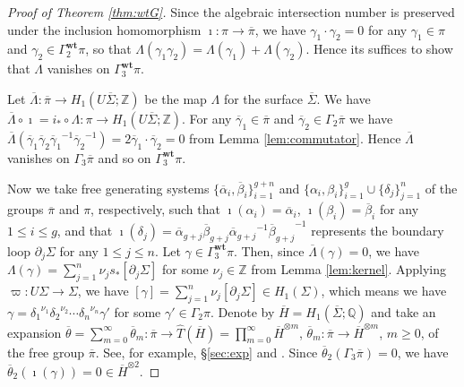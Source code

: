 \documentclass[a4paper,12pt, twoside]{amsart}
\theoremstyle{definition}
\theoremstyle{remark}
\numberwithin{equation}{section}
\newcommand\bQ{{\mathbb{Q}}}
\newcommand\bZ{{\mathbb{Z}}}
\newcommand\Gwt{\Gamma^{\mathbf{wt}}}
\newcommand\inv{^{-1}}
\newcommand\La{\Lambda}
\newcommand\pa{\partial}
\begin{document}
\begin{proof}[Proof of Theorem \ref{thm:wtG}]  Since the algebraic intersection number is preserved under the inclusion homomorphism $\imath: \pi \to \overline{\pi}$, we have $\gamma_1\cdot \gamma_2 = 0$ for any $\gamma_1\in\pi$ and $\gamma_2 \in \Gwt_2\pi$, 
so that $\La(\gamma_1\gamma_2) = \La(\gamma_1) + \La(\gamma_2)$. 
Hence its suffices to show that $\La$ vanishes on $\Gwt_3\pi$. \par
Let $\overline{\La}: \overline{\pi} \to H_1(U\overline{\Sigma}; \bZ)$ be the map $\La$ for the surface $\overline{\Sigma}$. 
We have $\overline{\La}\circ\imath = i_*\circ \La: \pi \to H_1(U\overline{\Sigma}; \bZ)$. 
For any $\overline{\gamma}_1 \in \overline{\pi}$ and $\overline{\gamma}_2 \in \Gamma_2\overline{\pi}$ we have $\overline{\La}(\overline{\gamma}_1\overline{\gamma}_2{\overline{\gamma}_1}\inv{\overline{\gamma}_2}\inv) = 2\overline{\gamma}_1\cdot \overline{\gamma}_2 = 0$ from Lemma \ref{lem:commutator}. Hence $\overline{\La}$ vanishes on $\Gamma_3\overline{\pi}$ and so on $\Gwt_3\pi$. \par
Now we take free generating systems $\{\overline{\alpha}_i, \overline{\beta}_i\}^{g+n}_{i=1}$ and $\{\alpha_i, \beta_i\}^g_{i=1}\cup \{\delta_j\}^n_{j=1}$ of the groups $\overline{\pi}$ and $\pi$, respectively, such that $\imath(\alpha_i) = \overline{\alpha}_i$, $\imath(\beta_i) = \overline{\beta}_i$ for any $1 \leq i \leq g$, and that $\imath(\delta_j) = \overline{\alpha}_{g+j}\overline{\beta}_{g+j}{\overline{\alpha}_{g+j}}\inv{\overline{\beta}_{g+j}}\inv$ represents the boundary loop $\pa_j\Sigma$ for any $1 \leq j \leq n$.  
Let $\gamma \in \Gwt_3\pi$. Then, since $\overline{\La}(\gamma) = 0$, 
we have $\La(\gamma) = \sum^n_{j=1}\nu_js_*[\pa_j\Sigma]$ for some $\nu_j \in \bZ$
from Lemma \ref{lem:kernel}. Applying $\varpi: U\Sigma \to \Sigma$, we have 
$[\gamma] = \sum^n_{j=1}\nu_j[\pa_j\Sigma] \in H_1(\Sigma)$, which means we have 
$\gamma = {\delta_1}^{\nu_1}{\delta_2}^{\nu_2}\cdots {\delta_n}^{\nu_n}\gamma'$ for some $\gamma' \in \Gamma_2\pi$. 
Denote by $\overline{H} = H_1(\overline{\Sigma}; \bQ)$ and take an expansion $\overline{\theta} = \sum^\infty_{m=0}\overline{\theta}_m: \overline{\pi} \to \widehat{T}(\overline{H}) = \prod^\infty_{m=0}\overline{H}^{\otimes m}$, 
$\overline{\theta}_m: \overline{\pi} \to \overline{H}^{\otimes m}$, $m \geq 0$, of the free group $\overline{\pi}$. See, for example, \S\ref{sec:exp} and \cite{Kaw05}. 
Since $\overline{\theta}_2(\Gamma_3\overline{\pi}) = 0$, we have 
$\overline{\theta}_2(\imath(\gamma)) = 0 \in \overline{H}^{\otimes 2}$. 

\end{proof}
\end{document}
